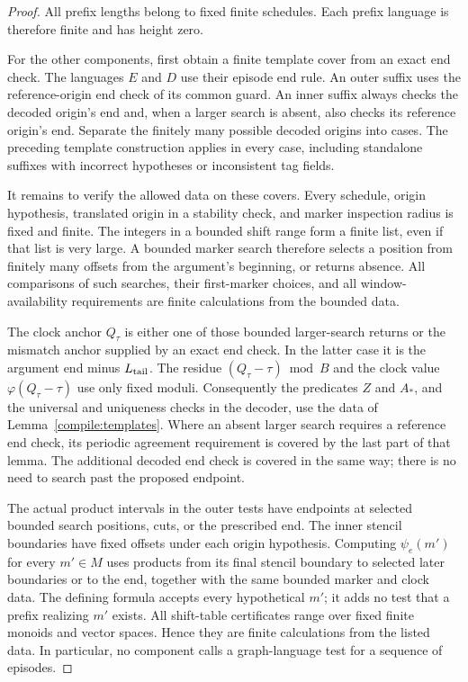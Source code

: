 \begin{proof}
All prefix lengths belong to fixed finite schedules. Each prefix language
is therefore finite and has height zero.

For the other components, first obtain a finite template cover from an
exact end check. The languages $E$ and $D$ use their episode end rule.
An outer suffix uses the reference-origin end check of its common guard.
An inner suffix always checks the decoded origin's end and, when a larger
search is absent, also checks its reference origin's end. Separate the
finitely many possible decoded origins into cases. The preceding template
construction applies in every case, including standalone suffixes with
incorrect hypotheses or inconsistent tag fields.

It remains to verify the allowed data on these covers. Every schedule,
origin hypothesis, translated origin in a stability check, and marker
inspection radius is fixed and finite. The integers in a bounded shift
range form a finite list, even if that list is very large. A bounded marker
search therefore selects a position from finitely many offsets from the
argument's beginning, or returns absence. All comparisons of such searches,
their first-marker choices, and all window-availability requirements are
finite calculations from the bounded data.

The clock anchor $Q_\tau$ is either one of those bounded larger-search
returns or the mismatch anchor supplied by an exact end check. In the
latter case it is the argument end minus $L_{\rm tail}$. The residue
$(Q_\tau-\tau)\bmod B$ and the clock value $\varphi(Q_\tau-\tau)$ use only
fixed moduli. Consequently the predicates $Z$ and $A_*$, and the universal
and uniqueness checks in the decoder, use the data of
Lemma~\ref{compile:templates}. Where an absent larger search requires a
reference end check, its periodic agreement requirement is covered by
the last part of that lemma. The additional decoded end check is covered
in the same way; there is no need to search past the proposed endpoint.

The actual product intervals in the outer tests have endpoints at selected
bounded search positions, cuts, or the prescribed end. The inner stencil
boundaries have fixed offsets under each origin hypothesis. Computing
$\psi_e(m')$ for every $m'\in M$ uses products from its final stencil
boundary to selected later boundaries or to the end, together with the
same bounded marker and clock data. The defining formula accepts every
hypothetical $m'$; it adds no test that a prefix realizing $m'$ exists.
All shift-table certificates range over fixed finite monoids and vector
spaces. Hence they are finite calculations from the listed data. In
particular, no component calls a graph-language test for a sequence of
episodes.


\end{proof}
